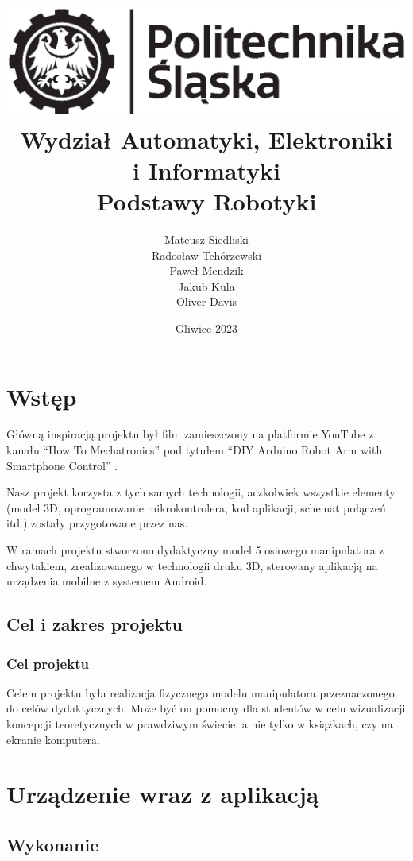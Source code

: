 \documentclass[11pt,titlepage]{article}
\title{
\includegraphics[scale=0.75]{img/politechnika_sl_logo_bw_poziom_pl.eps}\\
\textbf{Wydział Automatyki, Elektroniki\\
i Informatyki}\\
\vspace*{1cm}
Podstawy Robotyki
}
\author{Mateusz Siedliski\\
Radosław Tchórzewski\\
Paweł Mendzik\\
Jakub Kula\\
Oliver Davis}
\date{Gliwice 2023}
\begin{document}
\maketitle

\tableofcontents

\newpage

\listoffigures

\listoftables

\printbibliography

\newpage

\section{Wstęp}

Główną inspiracją projektu był film zamieszczony na platformie YouTube z kanału \enquote{How To Mechatronics} pod tytułem \enquote{DIY Arduino Robot Arm with Smartphone Control} \cite*{HTM_YT}.

Nasz projekt korzysta z tych samych technologii, aczkolwiek wszystkie elementy (model 3D, oprogramowanie mikrokontrolera, kod aplikacji, schemat połączeń itd.) zostały przygotowane przez nas.

W ramach projektu stworzono dydaktyczny model 5 osiowego manipulatora z chwytakiem, zrealizowanego w technologii druku 3D, sterowany aplikacją na urządzenia mobilne z systemem Android.

\subsection{Cel i zakres projektu}

\subsubsection{Cel projektu}

Celem projektu była realizacja fizycznego modelu manipulatora przeznaczonego do celów dydaktycznych. Może być on pomocny dla studentów w celu wizualizacji koncepcji teoretycznych w prawdziwym świecie, a nie tylko w książkach, czy na ekranie komputera.

\section{Urządzenie wraz z aplikacją}

\subsection{Wykonanie}
\end{document}

